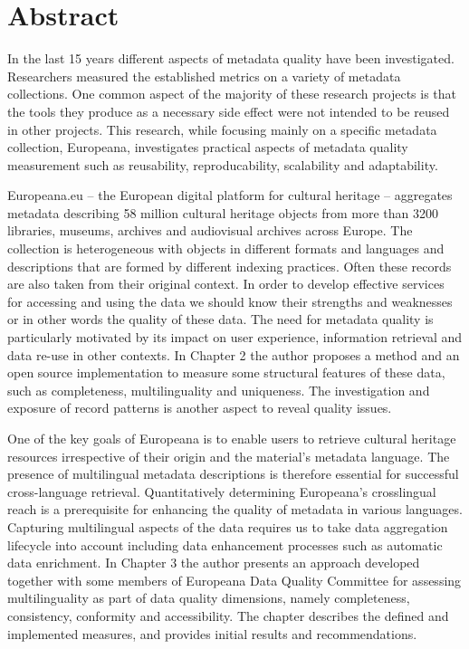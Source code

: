 \chapter*{Abstract}

In the last 15 years different aspects of  metadata quality have been investigated. Researchers measured the established metrics on a variety of metadata collections. One common aspect of the majority of these research projects is that the tools they produce as a necessary side effect were not intended to be reused in other projects. This research, while focusing mainly on a specific metadata collection, Europeana, investigates  practical aspects of metadata quality measurement such as reusability, reproducability, scalability and adaptability.

Europeana.eu -- the European digital platform for cultural heritage -- aggregates metadata describing 58 million cultural heritage objects from more than 3200 libraries, museums, archives and audiovisual archives across Europe. The collection is heterogeneous with objects in different formats and languages and descriptions that are formed by different indexing practices. Often these records are also taken from their original context. In order to develop effective services for accessing and using the data we should know their strengths and weaknesses or in other words the quality of these data. The need for metadata quality is particularly motivated by its impact on user experience, information retrieval and data re-use in other contexts. In Chapter 2 the author proposes a method and an open source implementation to measure some structural features of these data, such as completeness, multilinguality and uniqueness. The investigation and exposure of record patterns is another aspect to reveal quality issues.

One of the key goals of Europeana is to enable users to retrieve cultural heritage resources irrespective of their origin and the material’s metadata language. The presence of multilingual metadata descriptions is therefore essential for successful cross-language retrieval. Quantitatively determining Europeana’s crosslingual reach is a prerequisite for enhancing the quality of metadata in various languages. Capturing multilingual aspects of the data requires us to take data aggregation lifecycle into account including data enhancement processes such as automatic data enrichment. In Chapter 3 the author presents an approach developed together with some members of Europeana Data Quality Committee for assessing multilinguality as part of data quality dimensions, namely completeness, consistency, conformity and accessibility. The chapter describes the defined and implemented measures, and provides initial results and recommendations.

